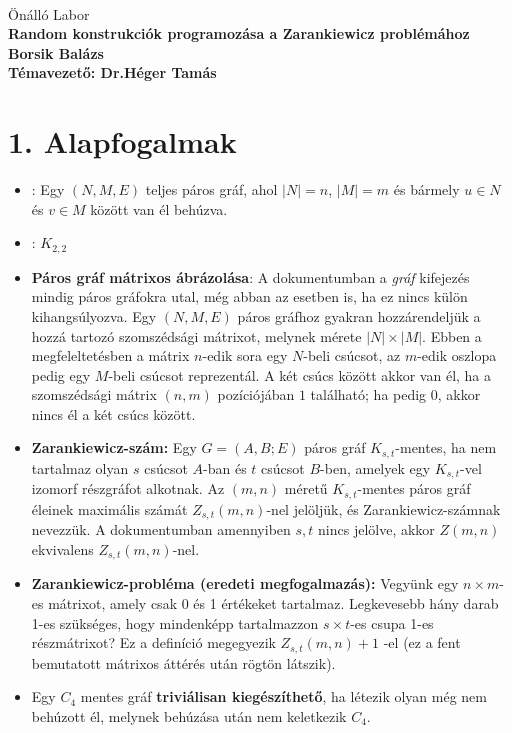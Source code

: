 \documentclass[12pt,a4paper]{article}
\begin{document}
 \ \
\vspace{2mm}
\begin{center}
{\Large\sc
Önálló Labor\\[5mm]
\bf 
Random konstrukciók programozása a Zarankiewicz problémához
\\[10mm]
{\Large
Borsik Balázs
}\\[10mm]
Témavezető: Dr.Héger Tamás
}
\end{center}
\vspace{1cm}

\section*{1. Alapfogalmak}
\begin{itemize}
    \item {}: Egy $(N,M,E)$ teljes páros gráf, ahol $|N|=n$, $|M|=m$ és bármely $u \in N$ és $v \in M$ között van él behúzva.
    \item \bm{$C_4$}: $K_{2,2}$
    \item \textbf{Páros gráf mátrixos ábrázolása}: A dokumentumban a \emph{gráf} kifejezés mindig páros gráfokra utal, még abban az esetben is, ha ez nincs külön kihangsúlyozva. Egy $(N, M, E)$ páros gráfhoz gyakran hozzárendeljük a hozzá tartozó szomszédsági mátrixot, melynek mérete $|N| \times |M|$. Ebben a megfeleltetésben a mátrix $n$-edik sora egy $N$-beli csúcsot, az $m$-edik oszlopa pedig egy $M$-beli csúcsot reprezentál. A két csúcs között akkor van él, ha a szomszédsági mátrix $(n,m)$ pozíciójában $1$ található; ha pedig $0$, akkor nincs él a két csúcs között.
    \item \textbf{Zarankiewicz-szám:} Egy $G = (A,B;E)$ páros gráf $K_{s,t}$-mentes, ha nem tartalmaz olyan $s$ csúcsot $A$-ban és $t$ csúcsot $B$-ben, amelyek egy $K_{s,t}$-vel izomorf részgráfot alkotnak. Az $(m,n)$ méretű $K_{s,t}$-mentes páros gráf éleinek maximális számát $Z_{s,t}(m,n)$-nel jelöljük, és Zarankiewicz-számnak nevezzük. A dokumentumban amennyiben $s,t$ nincs jelölve, akkor $Z(m,n)$ ekvivalens $Z_{s,t}(m,n)$-nel. \cite{goddard2002zarankiewicz}
    \item \textbf{Zarankiewicz-probléma (eredeti megfogalmazás):} Vegyünk egy $n \times m$-es mátrixot, amely csak 0 és 1 értékeket tartalmaz. Legkevesebb hány darab 1-es szükséges, hogy mindenképp tartalmazzon $s \times t$-es csupa 1-es részmátrixot? Ez a definíció megegyezik $Z_{s,t}(m,n) + 1$ -el (ez a fent bemutatott mátrixos áttérés után rögtön látszik).
    \item Egy $C_4$ mentes gráf \textbf{triviálisan kiegészíthető}, ha létezik olyan még nem behúzott él, melynek behúzása után nem keletkezik $C_4$.
\end{itemize}
\end{document}
